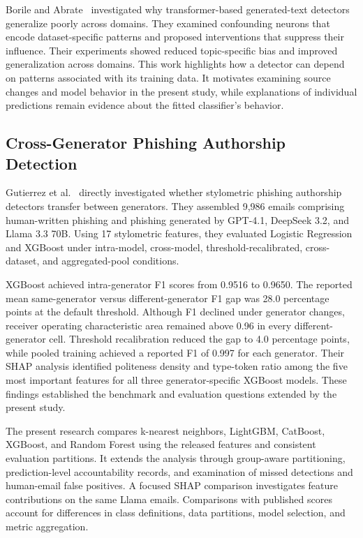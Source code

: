 \documentclass[conference]{IEEEtran}
\begin{document}
Borile and Abrate~\cite{borile2025} investigated why transformer-based
generated-text detectors generalize poorly across domains. They
examined confounding neurons that encode dataset-specific patterns
and proposed interventions that suppress their influence. Their
experiments showed reduced topic-specific bias and improved
generalization across domains. This work highlights how a detector
can depend on patterns associated with its training data. It motivates
examining source changes and model behavior in the present study,
while explanations of individual predictions remain evidence about
the fitted classifier's behavior.

\subsection{Cross-Generator Phishing Authorship Detection}

Gutierrez et al.~\cite{gutierrez2026} directly investigated whether
stylometric phishing authorship detectors transfer between generators.
They assembled 9,986 emails comprising human-written phishing
and phishing generated by GPT-4.1, DeepSeek 3.2, and Llama 3.3 70B.
Using 17 stylometric features, they evaluated Logistic Regression
and XGBoost under intra-model, cross-model, threshold-recalibrated,
cross-dataset, and aggregated-pool conditions.

XGBoost achieved intra-generator F1 scores from 0.9516 to 0.9650.
The reported mean same-generator versus different-generator F1 gap
was 28.0 percentage points at the default threshold. Although F1
declined under generator changes, receiver operating characteristic
area remained above 0.96 in every different-generator cell. Threshold
recalibration reduced the gap to 4.0 percentage points, while pooled
training achieved a reported F1 of 0.997 for each generator. Their
SHAP analysis identified politeness density and type-token ratio
among the five most important features for all three generator-specific
XGBoost models. These findings established the benchmark and
evaluation questions extended by the present study.

The present research compares k-nearest neighbors, LightGBM,
CatBoost, XGBoost, and Random Forest using the released features
and consistent evaluation partitions. It extends the analysis through
group-aware partitioning, prediction-level accountability records,
and examination of missed detections and human-email false
positives. A focused SHAP comparison investigates feature
contributions on the same Llama emails. Comparisons with published
scores account for differences in class definitions, data partitions,
model selection, and metric aggregation.
\end{document}

